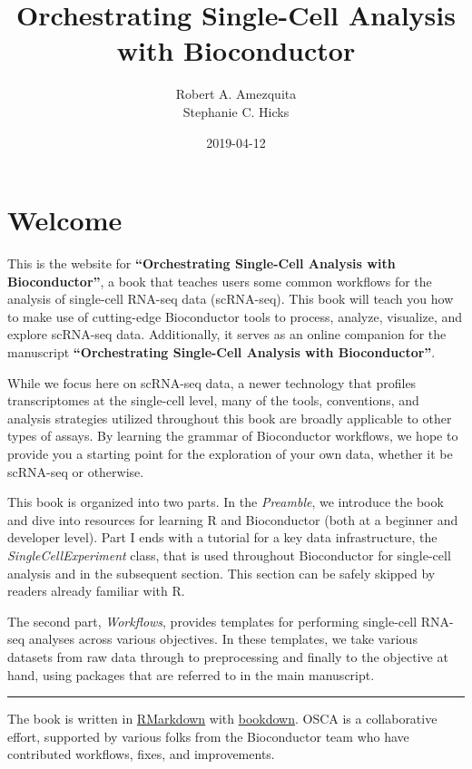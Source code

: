 \documentclass[]{book}
\title{Orchestrating Single-Cell Analysis with Bioconductor}
\author{Robert A. Amezquita \\ Stephanie C. Hicks}
\date{2019-04-12}
\begin{document}
\maketitle

{
\setcounter{tocdepth}{1}
\tableofcontents
}
\hypertarget{welcome}{%
\chapter*{Welcome}\label{welcome}}

This is the website for \textbf{``Orchestrating Single-Cell Analysis with Bioconductor''}, a book that teaches users some common workflows for the analysis of single-cell RNA-seq data (scRNA-seq). This book will teach you how to make use of cutting-edge Bioconductor tools to process, analyze, visualize, and explore scRNA-seq data. Additionally, it serves as an online companion for the manuscript \textbf{``Orchestrating Single-Cell Analysis with Bioconductor''}.

While we focus here on scRNA-seq data, a newer technology that profiles transcriptomes at the single-cell level, many of the tools, conventions, and analysis strategies utilized throughout this book are broadly applicable to other types of assays. By learning the grammar of Bioconductor workflows, we hope to provide you a starting point for the exploration of your own data, whether it be scRNA-seq or otherwise.

This book is organized into two parts. In the \emph{Preamble}, we introduce the book and dive into resources for learning R and Bioconductor (both at a beginner and developer level). Part I ends with a tutorial for a key data infrastructure, the \emph{SingleCellExperiment} class, that is used throughout Bioconductor for single-cell analysis and in the subsequent section. This section can be safely skipped by readers already familiar with R.

The second part, \emph{Workflows}, provides templates for performing single-cell RNA-seq analyses across various objectives. In these templates, we take various datasets from raw data through to preprocessing and finally to the objective at hand, using packages that are referred to in the main manuscript.

\begin{center}\rule{0.5\linewidth}{\linethickness}\end{center}

The book is written in \href{https://rmarkdown.rstudio.com}{RMarkdown} with \href{https://bookdown.org}{bookdown}. OSCA is a collaborative effort, supported by various folks from the Bioconductor team who have contributed workflows, fixes, and improvements.
\end{document}
